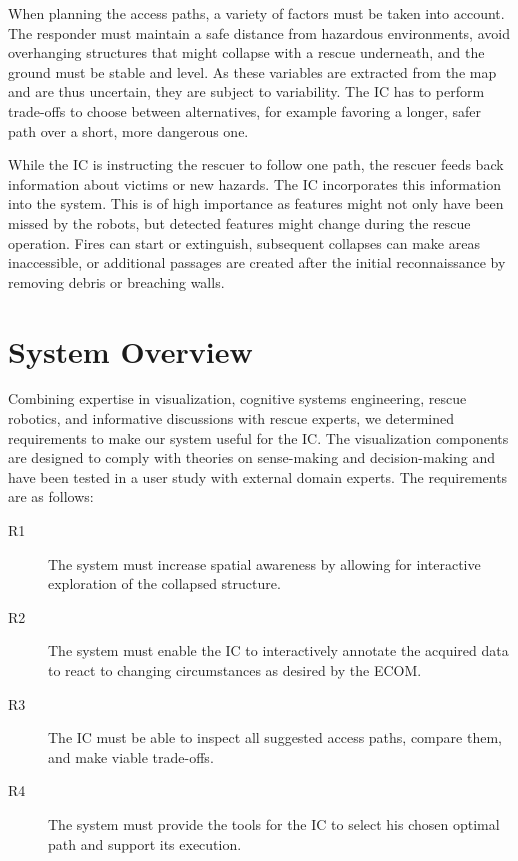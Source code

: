 \documentclass{egpubl}
\begin{document}
When planning the access paths, a variety of factors must be taken into account. The responder must maintain a safe distance from hazardous environments, avoid overhanging structures that might collapse with a rescue underneath, and the ground must be stable and level. As these variables are extracted from the map and are thus uncertain, they are subject to variability. The IC has to perform trade-offs to choose between alternatives, for example favoring a longer, safer path over a short, more dangerous one.

While the IC is instructing the rescuer to follow one path, the rescuer feeds back information about victims or new hazards. The IC incorporates this information into the system. This is of high importance as features might not only have been missed by the robots, but detected features might change during the rescue operation. Fires can start or extinguish, subsequent collapses can make areas inaccessible, or additional passages are created after the initial reconnaissance by removing debris or breaching walls.


\section{System Overview} \label{sec:overview}

Combining expertise in visualization, cognitive systems engineering, rescue robotics, and informative discussions with rescue experts, we determined requirements to make our system useful for the IC. The visualization components are designed to comply with theories on sense-making and decision-making and have been tested in a user study with external domain experts. The requirements are as follows:
\begin{description}
\item[R1] The system must increase spatial awareness by allowing for interactive exploration of the collapsed structure.
\item[R2] The system must enable the IC to interactively annotate the acquired data to react to changing circumstances as desired by the ECOM.
\item[R3] The IC must be able to inspect all suggested access paths, compare them, and make viable trade-offs.
\item[R4] The system must provide the tools for the IC to select his chosen optimal path and support its execution.
\end{description}
\end{document}
